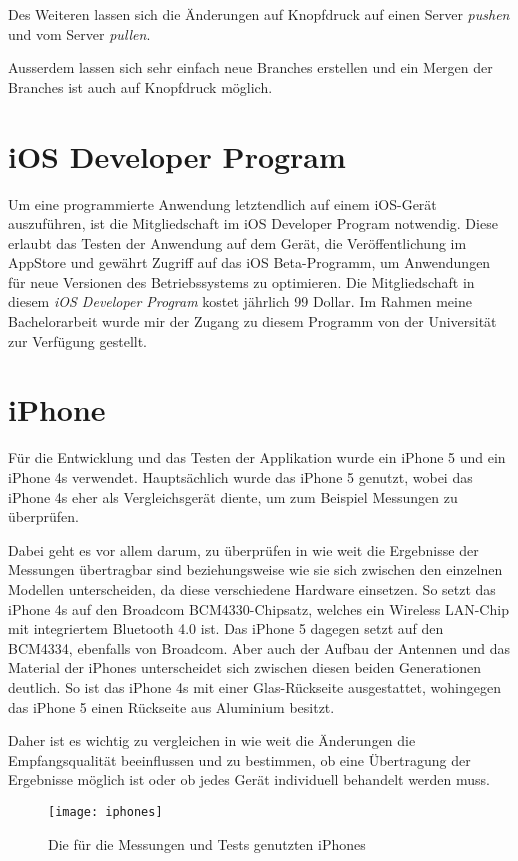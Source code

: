 Des Weiteren lassen sich die Änderungen auf Knopfdruck auf einen Server \emph{pushen} und vom Server \emph{pullen}.

Ausserdem lassen sich sehr einfach neue Branches erstellen und ein Mergen der Branches ist auch auf Knopfdruck möglich.


\section{iOS Developer Program}
\label{sec:iosdevprogram}
Um eine programmierte Anwendung letztendlich auf einem iOS-Gerät auszuführen, ist die Mitgliedschaft im iOS Developer Program notwendig.
Diese erlaubt das Testen der Anwendung auf dem Gerät, die Veröffentlichung im AppStore und gewährt Zugriff auf das iOS Beta-Programm, um Anwendungen für neue Versionen des Betriebssystems zu optimieren.
Die Mitgliedschaft in diesem \emph{iOS Developer Program} kostet jährlich 99 Dollar. 
Im Rahmen meine Bachelorarbeit wurde mir der Zugang zu diesem Programm von der Universität zur Verfügung gestellt.



\section{iPhone}
\label{sec:tools:iphone}
Für die Entwicklung und das Testen der Applikation wurde ein iPhone 5 und ein iPhone 4s verwendet. 
Hauptsächlich wurde das iPhone 5 genutzt, wobei das iPhone 4s eher als Vergleichsgerät diente, um zum Beispiel Messungen zu überprüfen.

Dabei geht es vor allem darum, zu überprüfen in wie weit die Ergebnisse der Messungen übertragbar sind beziehungsweise wie sie sich zwischen den einzelnen Modellen unterscheiden, da diese verschiedene Hardware einsetzen. So setzt das iPhone 4s auf den Broadcom BCM4330-Chipsatz, welches ein Wireless LAN-Chip mit integriertem Bluetooth 4.0 ist. Das iPhone 5 dagegen setzt auf den BCM4334, ebenfalls von Broadcom. 
Aber auch der Aufbau der Antennen und das Material der iPhones unterscheidet sich zwischen diesen beiden Generationen deutlich. 
So ist das iPhone 4s mit einer Glas-Rückseite ausgestattet, wohingegen das iPhone 5 einen Rückseite aus Aluminium besitzt.

Daher ist es wichtig zu vergleichen in wie weit die Änderungen die Empfangsqualität beeinflussen und zu bestimmen, ob eine Übertragung der Ergebnisse möglich ist oder ob jedes Gerät individuell behandelt werden muss.

\begin{figure}[htb!]
		\centering
	\texttt{[image: iphones]}
	\caption{Die für die Messungen und Tests genutzten iPhones}
	\label{iphones}
\end{figure}



